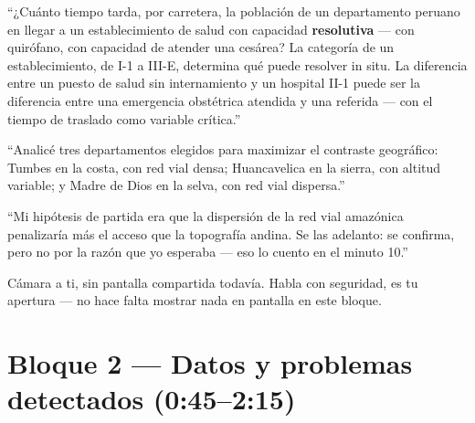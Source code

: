 \documentclass[11pt]{article}
\begin{document}
\begin{decirbox}
``¿Cuánto tiempo tarda, por carretera, la población de un departamento
peruano en llegar a un establecimiento de salud con capacidad
\textbf{resolutiva} --- con quirófano, con capacidad de atender una
cesárea? La categoría de un establecimiento, de I-1 a III-E, determina
qué puede resolver in situ. La diferencia entre un puesto de salud sin
internamiento y un hospital II-1 puede ser la diferencia entre una
emergencia obstétrica atendida y una referida --- con el tiempo de
traslado como variable crítica.''

``Analicé tres departamentos elegidos para maximizar el contraste
geográfico: Tumbes en la costa, con red vial densa; Huancavelica en la
sierra, con altitud variable; y Madre de Dios en la selva, con red vial
dispersa.''

``Mi hipótesis de partida era que la dispersión de la red vial amazónica
penalizaría más el acceso que la topografía andina. Se las adelanto: se
confirma, pero no por la razón que yo esperaba --- eso lo cuento en el
minuto 10.''
\end{decirbox}

\begin{hacerbox}
Cámara a ti, sin pantalla compartida todavía. Habla con seguridad, es tu
apertura --- no hace falta mostrar nada en pantalla en este bloque.
\end{hacerbox}

\section{Bloque 2 --- Datos y problemas detectados (0:45--2:15)}
\end{document}
